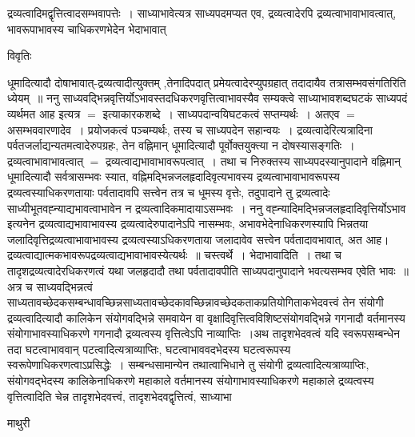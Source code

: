 \documentclass[10pt, openany]{book}
\begin{document}
{{\la द्रव्यत्वादिमद्वृत्तित्वादसम्भवापत्तेः~। साध्याभावेत्यत्र साध्यपदमप्यत एव, द्रव्यत्वादेरपि द्रव्यत्वाभावाभावत्वात्, भावरूपाभावस्य  चाधिकरणभेदेन भेदाभावात् }
\begin{center}     विवृतिः \end{center}
धूमादित्यादौ दोषाभावात्-द्रव्यत्वादीत्युक्तम् ,तेनादिपदात् प्रमेयत्वादेरप्युपग्रहात् तदादायैव तत्रासम्भवसंगतिरिति ध्येयम्~॥ ननु
साध्यवद्भिन्नवृत्तिर्योऽभावस्तदधिकरणवृत्तित्वाभावस्यैव सम्यक्त्वे साध्याभावशब्दघटकं साध्यपदं व्यर्थमत आह इत्यत्र $=$ इत्याकारकशब्दे~। साध्यपदान्वयिघटकत्वं सप्तम्यर्थः~। अतएव $=$ असम्भववारणादेव~। प्रयोजकत्वं पञ्चम्यर्थः, तस्य च साध्यपदेन सहान्वयः~। द्रव्यत्वादेरित्यत्रादिना पर्वतजर्लाद्यन्यतमत्वादेरुपग्रहः, तेन वह्निमान् धूमादित्यादौ पूर्वोक्तयुक्त्या न दोषस्यासङ्गतिः~। द्रव्यत्वाभावाभावत्वात् $=$ द्रव्यत्वाद्यभावाभावरूपत्वात्~। तथा च निरुक्तस्य साध्यपदस्यानुपादाने वह्निमान् धूमादित्यादौ सर्वत्रासम्भवः स्यात, वह्निमद्भिन्नजलहृदादिवृत्यभावस्य द्रव्यत्वाभावाभावरूपस्य द्रव्यत्वस्याधिकरणतायाः पर्वतादावपि सत्त्वेन तत्र च धूमस्य वृत्तेः, तदुपादाने तु द्रव्यत्वादेः साध्यीभूतवह्न्याद्यभावत्वाभावेन न द्रव्यत्वादिकमादायाऽसम्भवः~।  ननु वह्न्यादिमद्भिन्नजलहृदादिवृत्तिर्योऽभाव इत्यनेन द्रव्यत्वाद्यभावाभावस्य द्रव्यत्वादेरुपादानेऽपि नासम्भवः, अभावभेदेनाधिकरणस्यापि भिन्नतया जलादिवृत्तिद्रव्यत्वाभावाभावस्य द्रव्यत्वस्याऽधिकरणताया जलादावेव सत्त्वेन पर्वतादावभावात्, अत आह। द्रव्यत्वाद्यात्मकभावरूपद्रव्यत्वाद्यभावाभावस्येत्यर्थः~॥ चस्त्वर्थे~। {\qt भेदाभावादिति}~। तथा च तादृशद्रव्यत्वादेरधिकरणत्वं यथा जलहृदादौ तथा पर्वतादावपीति साध्यपदानुपादाने भवत्यसम्भव एवेति भावः~॥\\

अत्र च साध्यवद्भिन्नत्वं साध्यतावच्छेदकसम्बन्धावच्छिन्नसाध्यतावच्छेदकावच्छिन्नावच्छेदकताकप्रतियोगिताकभेदवत्त्वं तेन संयोगी द्रव्यत्वादित्यादौ कालिकेन
संयोगवद्भिन्ने समवायेन वा वृक्षादिवृत्तित्वविशिष्टसंयोगवद्भिन्ने गगनादौ वर्तमानस्य संयोगाभावस्याधिकरणे गगनादौ द्रव्यत्वस्य वृत्तित्वेऽपि नाव्याप्तिः~।अथ तादृशभेदवत्वं यदि स्वरूपसम्बन्धेन तदा घटत्वाभाववान् पटत्वादित्यत्राव्याप्तिः, घटत्वाभाववदभेदस्य घटत्वरूपस्य स्वरूपेणाधिकरणत्वाऽप्रसिद्धेः~। सम्बन्धसामान्येन तथात्वाभिधाने तु संयोगी द्रव्यत्वादित्यत्राव्याप्तिः, संयोगवद्भेदस्य कालिकेनाधिकरणे महाकाले वर्तमानस्य संयोगाभावस्याधिकरणे महाकाले द्रव्यत्वस्य वृत्तित्वादिति चेन्न तादृशभेदवत्त्वं, तादृशभेदवद्वृत्तित्वं, साध्याभा
\newpage
\begin{center}  माथुरी  \end{center}

}
\end{document}
